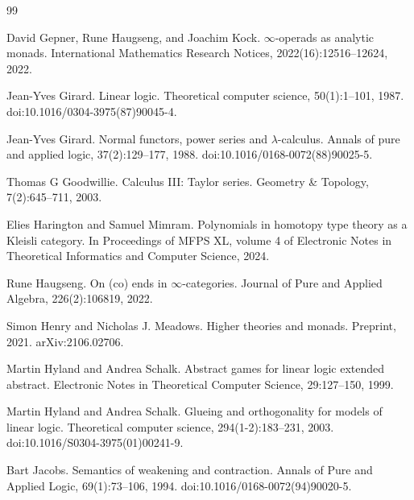\documentclass[10pt,a4paper]{article}
\begin{document}
\begin{thebibliography}{99}
\par\noindent    David Gepner, Rune Haugseng, and Joachim Kock.  $\infty$-operads as analytic monads.  International Mathematics Research Notices, 2022(16):12516–12624, 2022.  

\par\noindent    Jean-Yves Girard.  Linear logic.  Theoretical computer science, 50(1):1–101, 1987.  doi:10.1016/0304-3975(87)90045-4.  

\par\noindent    Jean-Yves Girard.  Normal functors, power series and $\lambda$-calculus.  Annals of pure and applied logic, 37(2):129–177, 1988.  doi:10.1016/0168-0072(88)90025-5.  

\par\noindent    Thomas G Goodwillie.  Calculus III: Taylor series.  Geometry \& Topology, 7(2):645–711, 2003.  

\par\noindent    Elies Harington and Samuel Mimram.  Polynomials in homotopy type theory as a Kleisli category.  In Proceedings of MFPS XL, volume 4 of Electronic Notes in Theoretical Informatics and Computer Science, 2024.  

\par\noindent    Rune Haugseng.  On (co) ends in $\infty$-categories.  Journal of Pure and Applied Algebra, 226(2):106819, 2022.  

\par\noindent    Simon Henry and Nicholas J. Meadows.  Higher theories and monads.  Preprint, 2021.  arXiv:2106.02706.  

\par\noindent    Martin Hyland and Andrea Schalk.  Abstract games for linear logic extended abstract.  Electronic Notes in Theoretical Computer Science, 29:127–150, 1999.  

\par\noindent    Martin Hyland and Andrea Schalk.  Glueing and orthogonality for models of linear logic.  Theoretical computer science, 294(1-2):183–231, 2003.  doi:10.1016/S0304-3975(01)00241-9.  

\par\noindent    Bart Jacobs.  Semantics of weakening and contraction.  Annals of Pure and Applied Logic, 69(1):73–106, 1994.  doi:10.1016/0168-0072(94)90020-5.  


\end{thebibliography}
\end{document}
